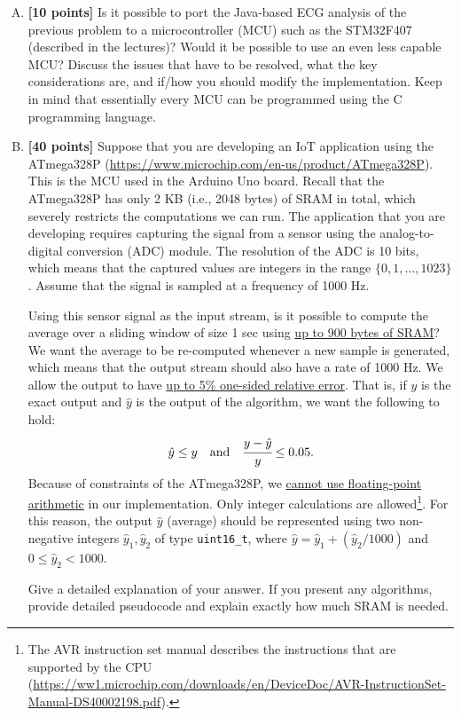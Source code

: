 \documentclass[11pt]{article}
\newcommand{\mnt}[1]{{\small\texttt{#1}}}
\begin{document}
\begin{enumerate}[(A)]
\item
\textbf{[10 points]}
Is it possible to port the Java-based ECG analysis of the previous problem to a microcontroller (MCU) such as the STM32F407 (described in the lectures)? Would it be possible to use an even less capable MCU? Discuss the issues that have to be resolved, what the key considerations are, and if/how you should modify the implementation. Keep in mind that essentially every MCU can be programmed using the C programming language.

\item
\textbf{[40 points]}
Suppose that you are developing an IoT application using the ATmega328P (\url{https://www.microchip.com/en-us/product/ATmega328P}). This is the MCU used in the Arduino Uno board. Recall that the ATmega328P has only 2 KB (i.e., 2048 bytes) of SRAM in total, which severely restricts the computations we can run. The application that you are developing requires capturing the signal from a sensor using the analog-to-digital conversion (ADC) module. The resolution of the ADC is 10 bits, which means that the captured values are integers in the range $\{ 0, 1, \ldots, 1023 \}$. Assume that the signal is sampled at a frequency of 1000 Hz.

Using this sensor signal as the input stream, is it possible to compute the average over a sliding window of size 1 sec using \underline{up to 900 bytes of SRAM}? We want the average to be re-computed whenever a new sample is generated, which means that the output stream should also have a rate of 1000 Hz. We allow the output to have \underline{up to 5\% one-sided relative error}. That is, if $y$ is the exact output and $\hat y$ is the output of the algorithm, we want the following to hold:
\[
  \hat y \leq y
  \quad\text{and}\quad
  \cfrac{y - \hat y}{y} \leq 0.05.
\]
Because of constraints of the ATmega328P, we \underline{cannot use floating-point arithmetic} in our implementation. Only integer calculations are allowed\footnote{The AVR instruction set manual describes the instructions that are supported by the CPU (\url{https://ww1.microchip.com/downloads/en/DeviceDoc/AVR-InstructionSet-Manual-DS40002198.pdf}).}. For this reason, the output $\hat y$ (average) should be represented using two non-negative integers $\hat y_1, \hat y_2$ of type \mnt{uint16_t}, where $\hat y = \hat y_1 + (\hat y_2 / 1000)$ and $0 \leq \hat y_2 < 1000$.

Give a detailed explanation of your answer. If you present any algorithms, provide detailed pseudocode and explain exactly how much SRAM is needed.


\end{enumerate}
\end{document}
